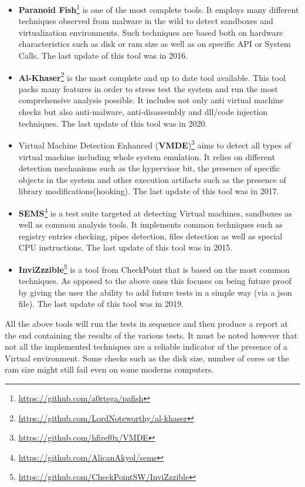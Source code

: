 \begin{itemize}
    \item \textbf{Paranoid Fish}\footnote{\url{https://github.com/a0rtega/pafish}} is one of the most complete tools. It employs many different techniques observed from malware in the wild to detect sandboxes and virtualization environments. Such techniques are based both on hardware characteristics such as disk or ram size as well as on specific API or System Calls. The last update of this tool was in 2016.
    
    \item \textbf{Al-Khaser}\footnote{\url{https://github.com/LordNoteworthy/al-khaser}} is the most complete and up to date tool available. This tool packs many features in order to stress test the system and run the most comprehensive analysis possible. It includes not only anti virtual machine checks but also anti-malware, anti-disassembly and dll/code injection techniques. The last update of this tool was in 2020.
        
    \item Virtual Machine Detection Enhanced (\textbf{VMDE})\footnote{\url{https://github.com/hfiref0x/VMDE}} aims to detect all types of virtual machine including whole system emulation. It relies on different detection mechanisms such as the hypervisor bit, the presence of specific objects in the system and other execution artifacts such as the presence of library modifications(hooking). The last update of this tool was in 2017.
    
    \item \textbf{SEMS}\footnote{\url{https://github.com/AlicanAkyol/sems}} is a test suite targeted at detecting Virtual machines, sandboxes as well as common analysis tools. It implements common techniques such as registry entries checking, pipes detection, files detection as well as special CPU instructions. The last update of this tool was in 2015.
    
    \item \textbf{InviZzzible}\footnote{\url{https://github.com/CheckPointSW/InviZzzible}} is a tool from CheckPoint that is based on the most common techniques. As opposed to the above ones this focuses on being future proof by giving the user the ability to add future tests in a simple way (via a json file). The last update of this tool was in 2019.
    
\end{itemize}

All the above tools will run the tests in sequence and then produce a report at the end containing the results of the various tests. It must be noted however that not all the implemented techniques are a reliable indicator of the presence of a Virtual environment. Some checks such as the disk size, number of cores or the ram size might still fail even on some moderns computers. 

